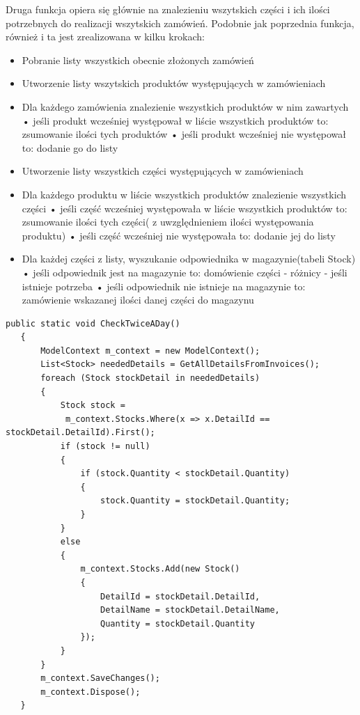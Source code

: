 \documentclass{article}
\begin{document}
Druga funkcja opiera się głównie na znalezieniu wszytskich części i ich ilości potrzebnych do
realizacji wszytskich zamówień. Podobnie jak poprzednia funkcja, również i ta jest zrealizowana w
kilku krokach:
\begin{itemize}
   \item Pobranie listy wszystkich obecnie złożonych zamówień
   \item Utworzenie listy wszytskich produktów występujących w zamówieniach
   \item Dla każdego zamówienia znalezienie wszystkich produktów w nim zawartych 
      \subitem • jeśli produkt wcześniej występował w liście wszystkich produktów to: zsumowanie
      ilości tych produktów
      \subitem • jeśli produkt wcześniej nie występował to: dodanie go do listy
   \item Utworzenie listy wszystkich części występujących w zamówieniach
   \item Dla każdego produktu w liście wszystkich produktów znalezienie wszystkich części
      \subitem • jeśli część wcześniej występowała w liście wszystkich produktów to: zsumowanie
      ilości tych części( z uwzględnieniem ilości występowania produktu)
      \subitem • jeśli część wcześniej nie występowała to: dodanie jej do listy
   \item Dla każdej części z listy, wyszukanie odpowiednika w magazynie(tabeli Stock)
      \subitem • jeśli odpowiednik jest na magazynie to: domówienie części - różnicy - jeśli istnieje
       potrzeba 
      \subitem • jeśli odpowiednik nie istnieje na magazynie to: zamówienie wskazanej ilości danej
      części do magazynu 
\end{itemize}
\begin{lstlisting}[style=sharpc,caption={Funkcja sprawdzania magazynu wywoływana dwa razy dziennie}]
   public static void CheckTwiceADay()
   {
       ModelContext m_context = new ModelContext();
       List<Stock> neededDetails = GetAllDetailsFromInvoices();
       foreach (Stock stockDetail in neededDetails)
       {
           Stock stock = 
            m_context.Stocks.Where(x => x.DetailId == stockDetail.DetailId).First();
           if (stock != null)
           {
               if (stock.Quantity < stockDetail.Quantity)
               {
                   stock.Quantity = stockDetail.Quantity;
               }
           }
           else
           {
               m_context.Stocks.Add(new Stock()
               {
                   DetailId = stockDetail.DetailId,
                   DetailName = stockDetail.DetailName,
                   Quantity = stockDetail.Quantity
               });
           }
       }
       m_context.SaveChanges();
       m_context.Dispose();
   }
\end{lstlisting}
\end{document}
